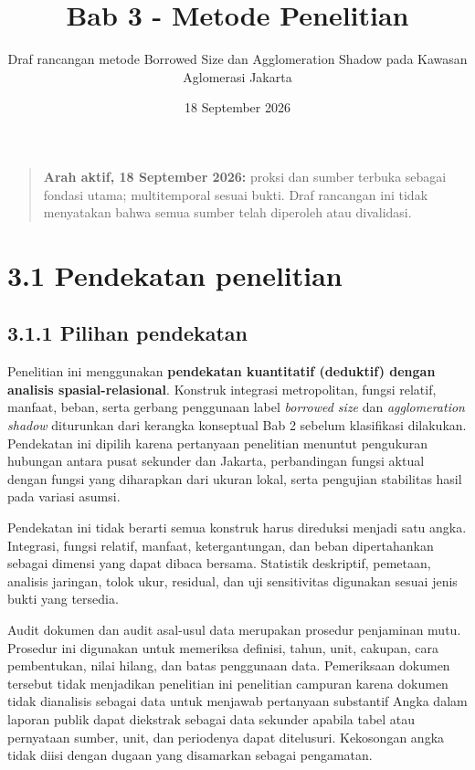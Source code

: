 \documentclass[
  indonesian,
  11pt,
  a4paper,
  oneside,
  openany]{report}
\title{Bab 3 - Metode Penelitian}
\subtitle{Draf rancangan metode Borrowed Size dan Agglomeration Shadow
pada Kawasan Aglomerasi Jakarta}
\author{}
\date{18 September 2026}
\begin{document}
\maketitle
\renewcommand*\contentsname{Daftar Isi}
\setcounter{tocdepth}{2}
\tableofcontents\clearpage
\begin{quote}
\textbf{Arah aktif, 18 September 2026:} proksi dan sumber terbuka
sebagai fondasi utama; multitemporal sesuai bukti. Draf rancangan ini
tidak menyatakan bahwa semua sumber telah diperoleh atau divalidasi.
\end{quote}

\section{3.1 Pendekatan penelitian}\label{pendekatan-penelitian}

\subsection{3.1.1 Pilihan pendekatan}\label{pilihan-pendekatan}

Penelitian ini menggunakan \textbf{pendekatan kuantitatif (deduktif)
dengan analisis spasial-relasional}. Konstruk integrasi metropolitan,
fungsi relatif, manfaat, beban, serta gerbang penggunaan label
\emph{borrowed size} dan \emph{agglomeration shadow} diturunkan dari
kerangka konseptual Bab 2 sebelum klasifikasi dilakukan. Pendekatan ini
dipilih karena pertanyaan penelitian menuntut pengukuran hubungan antara
pusat sekunder dan Jakarta, perbandingan fungsi aktual dengan fungsi
yang diharapkan dari ukuran lokal, serta pengujian stabilitas hasil pada
variasi asumsi.

Pendekatan ini tidak berarti semua konstruk harus direduksi menjadi satu
angka. Integrasi, fungsi relatif, manfaat, ketergantungan, dan beban
dipertahankan sebagai dimensi yang dapat dibaca bersama. Statistik
deskriptif, pemetaan, analisis jaringan, tolok ukur, residual, dan uji
sensitivitas digunakan sesuai jenis bukti yang tersedia.

Audit dokumen dan audit asal-usul data merupakan prosedur penjaminan
mutu. Prosedur ini digunakan untuk memeriksa definisi, tahun, unit,
cakupan, cara pembentukan, nilai hilang, dan batas penggunaan data.
Pemeriksaan dokumen tersebut tidak menjadikan penelitian ini penelitian
campuran karena dokumen tidak dianalisis sebagai data untuk menjawab
pertanyaan substantif Angka dalam laporan publik dapat diekstrak sebagai
data sekunder apabila tabel atau pernyataan sumber, unit, dan periodenya
dapat ditelusuri. Kekosongan angka tidak diisi dengan dugaan yang
disamarkan sebagai pengamatan.
\end{document}
